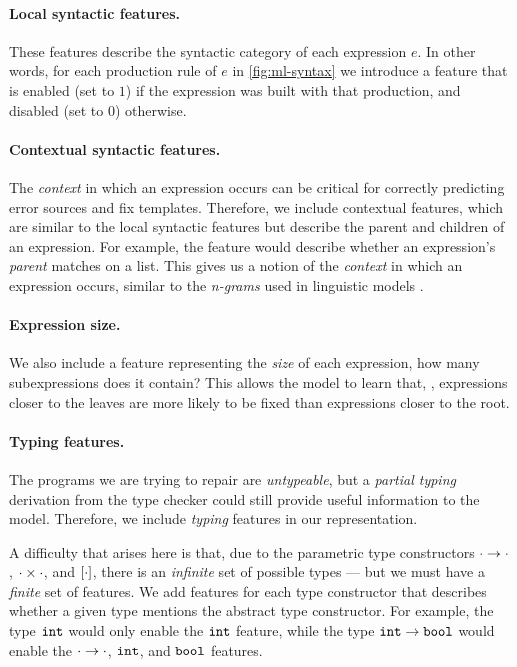 \paragraph{Local syntactic features.}
These features describe the syntactic category of each expression $e$. In other
words, for each production rule of $e$ in \autoref{fig:ml-syntax} we introduce a
feature that is enabled (set to $1$) if the expression was built with that
production, and disabled (set to $0$) otherwise.

\paragraph{Contextual syntactic features.}
The \emph{context} in which an expression occurs can be critical for correctly
predicting error sources and fix templates. Therefore, we include contextual
features, which are similar to the local syntactic features but describe the
parent and children of an expression. For example, the \IsCaseListP feature
would describe whether an expression's \emph{parent} matches on a list. This
gives us a notion of the \emph{context} in which an expression occurs, similar
to the \emph{n-grams} used in linguistic models
\citep{Hindle2012-hf,Gabel2010-el}.

\paragraph{Expression size.}
We also include a feature representing the \emph{size} of each expression, \ie
how many subexpressions does it contain? This allows the model to learn that,
\eg, expressions closer to the leaves are more likely to be fixed than
expressions closer to the root.

\paragraph{Typing features.}
The programs we are trying to repair are \emph{untypeable}, but a \emph{partial
typing} derivation from the type checker could still provide useful information
to the model. Therefore, we include \emph{typing} features in our
representation.

A difficulty that arises here is that, due to the parametric type constructors
$\cdot \to \cdot$, $\cdot \times \cdot$, and $[\cdot]$, there is an
\emph{infinite} set of possible types --- but we must have a \emph{finite} set
of features. We add features for each type constructor that describes whether a
given type mentions the abstract type constructor. For example, the type $\mathtt{int}$
would only enable the $\mathtt{int}$ feature, while the type $\mathtt{int} \to \mathtt{bool}$
would enable the $\cdot \to \cdot$, $\mathtt{int}$, and $\mathtt{bool}$ features.

